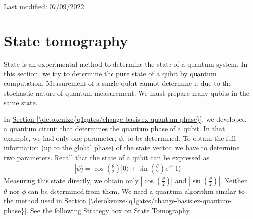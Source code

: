 \documentclass[letterpaper,10pt,english]{jupyterBook}
\begin{document}
\sphinxAtStartPar
Last modified: 07/09/2022

\sphinxstepscope


\section{State tomography}
\label{\detokenize{q1gates/tomography:state-tomography}}\label{\detokenize{q1gates/tomography:sec-state-tomography}}\label{\detokenize{q1gates/tomography::doc}}
\sphinxAtStartPar
State  is an experimental method to determine the state of a quantum system. In this section, we try to determine the pure state of a qubit by quantum computation.   Measurement of a single qubit cannot determine it due to the stochastic nature of quantum measurement.  We must prepare many  qubits in the same state.

\sphinxAtStartPar
In \hyperref[\detokenize{q1gates/change-basis:ex-quantum-phase}]{Section \ref{\detokenize{q1gates/change-basis:ex-quantum-phase}}}, we developed a quantum circuit that determines the quantum phase of a qubit.  In that example, we had only one parameter, \(\phi\), to be determined. To obtain the full information (up to the global phase) of the state vector, we have to determine two parameters.  Recall that the state of a qubit can be expressed as
\begin{equation*}
\begin{split}
|\psi\rangle = \cos\left(\frac{\theta}{2}\right) |0\rangle + \sin\left(\frac{\theta}{2}\right) e^{i \phi}|1\rangle
\end{split}
\end{equation*}
\sphinxAtStartPar
Measuring this state directly, we obtain only \(\left|\cos\left(\frac{\theta}{2}\right)\right|\) and \(\left|\sin\left(\frac{\theta}{2}\right)\right|\). Neither \(\theta\) nor \(\phi\) can be determined from them. We need a quantum algorithm similar to the method used in \hyperref[\detokenize{q1gates/change-basis:ex-quantum-phase}]{Section \ref{\detokenize{q1gates/change-basis:ex-quantum-phase}}}.  See the following Strategy box on State Tomography.
\end{document}

